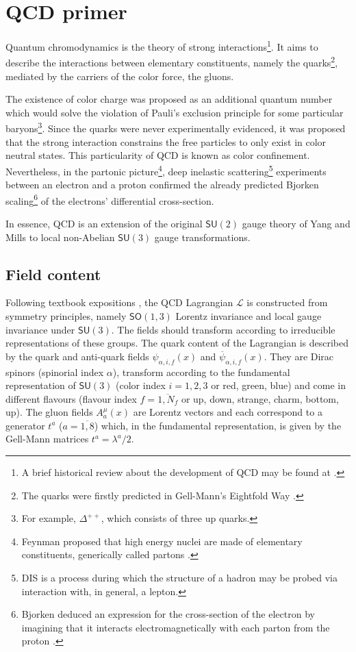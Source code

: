 \chapter{QCD primer}
\label{chap:qcd}

Quantum chromodynamics is the theory of strong interactions\footnote{A brief historical review about the development of {\sffamily QCD} may be found at \cite{historyqcd}.}. It aims to describe the interactions between elementary constituents, namely the quarks\footnote{The quarks were firstly predicted in Gell-Mann's Eightfold Way \cite{gellmann}.}, mediated by the carriers of the color force, the gluons.

The existence of color charge was proposed as an additional quantum number which would solve the violation of Pauli's exclusion principle for some particular baryons\footnote{For example, $\Delta^{++}$, which consists of three up quarks.}. Since the quarks were never experimentally evidenced, it was proposed that the strong interaction constrains the free particles to only exist in color neutral states. This particularity of {\sffamily QCD} is known as color confinement. Nevertheless, in the partonic picture\footnote{Feynman proposed that high energy nuclei are made of elementary constituents, generically called partons \cite{partons}.}, deep inelastic scattering\footnote{{\sffamily DIS} is a process during which the structure of a hadron may be probed via interaction with, in general, a lepton.} experiments between an electron and a proton confirmed the already predicted Bjorken scaling\footnote{Bjorken deduced an expression for the cross-section of the electron by imagining that it interacts electromagnetically with each parton from the proton \cite{bjorkenimf}.} of the electrons' differential cross-section.

In essence, {\sffamily QCD} is an extension of the original $\textsf{SU}(2)$ gauge theory of Yang and Mills \cite{yangmills} to local non-Abelian $\textsf{SU}(3)$ gauge transformations.

\section{Field content}
Following textbook expositions \cite{maggiore, peskin, greiner}, the {\sffamily QCD} Lagrangian $\mathcal{L}$ is constructed from symmetry principles, namely $\textsf{SO}(1,3)$ Lorentz invariance and local gauge invariance under $\textsf{SU}(3)$. The fields should transform according to irreducible representations of these groups. The quark content of the Lagrangian is described by the quark and anti-quark fields $\psi_{\alpha,i,f}(x)$ and $\overline{\psi}_{\alpha,i,f}(x)$. They are Dirac spinors (spinorial index $\alpha$), transform according to the fundamental representation of $\textsf{SU}(3)$ (color index $i=1,2,3$ or red, green, blue) and come in different flavours (flavour index $f=\overline{1,N_f}$ or up, down, strange, charm, bottom, up). The gluon fields $A_a^\mu(x)$ are Lorentz vectors and each correspond to a generator $t^a$ ($a=\overline{1,8}$) which, in the fundamental representation, is given by the Gell-Mann matrices $t^a=\lambda^a/2$.

